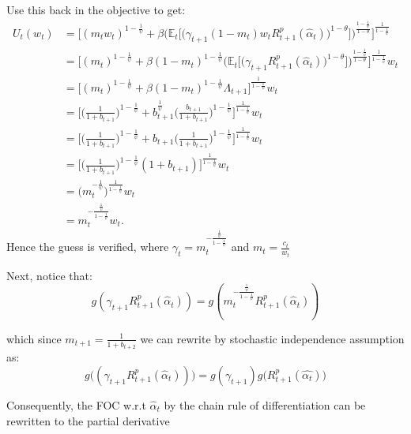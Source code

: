 \documentclass[12pt,a4paper]{article}
\begin{document}
Use this back in the objective to get: 
\begin{align*}
     U_t(w_t) &= \bigg[ (m_tw_t)^{1-\frac{1}{\psi}}+\beta\bigg(\mathbb{E}_t\bigg[\big(\gamma_{t+1}(1-m_t)w_tR^{p}_{t+1}(\hat{\alpha}_t)\big)^{1-\theta}\bigg]\bigg)^\frac{1-\frac{1}{\psi}}{1-\theta}\bigg]^\frac{1}{1-\frac{1}{\psi}}\\
     &= \bigg[ (m_t)^{1-\frac{1}{\psi}}+\beta(1-m_t)^{1-\frac{1}{\psi}}\bigg(\mathbb{E}_t\bigg[\big(\gamma_{t+1}R^{p}_{t+1}(\hat{\alpha}_t)\big)^{1-\theta}\bigg]\bigg)^\frac{1-\frac{1}{\psi}}{1-\theta}\bigg]^\frac{1}{1-\frac{1}{\psi}}w_t\\
     &=\bigg[ (m_t)^{1-\frac{1}{\psi}}+\beta(1-m_t)^{1-\frac{1}{\psi}}\Lambda_{t+1}\bigg]^\frac{1}{1-\frac{1}{\psi}}w_t\\
     &=\bigg[ \bigg(\frac{1}{1+b_{t+1}}\bigg)^{1-\frac{1}{\psi}}+b_{t+1}^{\frac{1}{\psi}}\bigg(\frac{b_{t+1}}{1+b_{t+1}}\bigg)^{1-\frac{1}{\psi}}\bigg]^\frac{1}{1-\frac{1}{\psi}}w_t\\
     &=\bigg[ \bigg(\frac{1}{1+b_{t+1}}\bigg)^{1-\frac{1}{\psi}}+b_{t+1}\bigg(\frac{1}{1+b_{t+1}}\bigg)^{1-\frac{1}{\psi}}\bigg]^\frac{1}{1-\frac{1}{\psi}}w_t\\
     &=\bigg[ \bigg(\frac{1}{1+b_{t+1}}\bigg)^{1-\frac{1}{\psi}}(1+b_{t+1})\bigg]^\frac{1}{1-\frac{1}{\psi}}w_t\\
     &=\bigg(m_t^{-\frac{1}{\psi}}\bigg)^{\frac{1}{1-\frac{1}{\psi}}}w_t\\
     &= m_t^{-\frac{\frac{1}{\psi}}{1-\frac{1}{\psi}}}w_t.
\end{align*}
Hence the guess is verified, where $\gamma_t=m_t^{-\frac{\frac{1}{\psi}}{1-\frac{1}{\psi}}}$ and $m_t=\frac{c_t}{w_t}$

 Next, notice that: 
\begin{equation*}
    g(\gamma_{t+1}R^{p}_{t+1}(\hat{\alpha}_t))=g(m_t^{-\frac{\frac{1}{\psi}}{1-\frac{1}{\psi}}}R^{p}_{t+1}(\hat{\alpha}_t))
\end{equation*}

which since $m_{t+1}=\frac{1}{1+b_{t+2}}$ we can rewrite by stochastic independence assumption as:
\begin{equation*}
     g\big((\gamma_{t+1}R^{p}_{t+1}(\hat{\alpha}_t))\big)=g(\gamma_{t+1})g\big(R^{p}_{t+1}(\hat{\alpha_t})\big)
\end{equation*} 

Consequently, the FOC w.r.t $\hat{\alpha}_t$ by the chain rule of differentiation can be rewritten to the partial derivative
\end{document}
